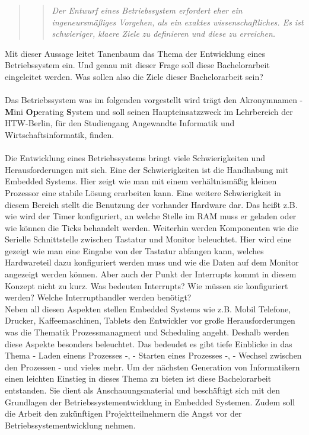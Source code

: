 \begin{quote}
\blockquote{\textit{Der Entwurf eines Betriebssystem erfordert eher ein ingeneursm\"a\ss iges Vorgehen, als ein exaktes wissenschaftliches. Es ist schwieriger, klaere Ziele zu definieren und diese zu erreichen.}}\parencite[911]{os}
\end{quote}
Mit dieser Aussage leitet Tanenbaum das Thema der Entwicklung eines Betriebssystem ein. Und genau mit dieser Frage soll diese Bachelorarbeit eingeleitet werden. Was sollen also die Ziele dieser Bachelorarbeit sein?\\\\
Das Betriebssystem was im folgenden vorgestellt wird tr\"agt den Akronymnamen \mops - \textbf{M}ini \textbf{Op}erating \textbf{S}ystem und soll seinen Haupteinsatzzweck im Lehrbereich der HTW-Berlin, f\"ur den Studiengang Angewandte Informatik und Wirtschaftsinformatik, finden.\\ \\
Die Entwicklung eines Betriebssystems bringt viele Schwierigkeiten und Herausforderungen mit sich. Eine der Schwierigkeiten ist die Handhabung mit Embedded Systems. Hier zeigt \mops wie man mit einem verh\"altnism\"a\ss ig kleinen Prozessor eine stabile L\"osung erarbeiten kann. Eine weitere Schwierigkeit in diesem Bereich stellt die Benutzung der vorhander Hardware dar. Das hei\ss t z.B. wie wird der Timer konfiguriert, an welche Stelle im RAM muss er geladen oder wie k\"onnen die Ticks behandelt werden. Weiterhin werden Komponenten wie die Serielle Schnittstelle zwischen Tastatur und Monitor beleuchtet. Hier wird eine gezeigt wie man eine Eingabe von der Tastatur abfangen kann, welches Hardwareteil dazu konfiguriert werden muss und wie die Daten auf dem Monitor angezeigt werden k\"onnen. Aber auch der Punkt der Interrupts kommt in diesem Konzept nicht zu kurz. Was bedeuten Interrupts? Wie m\"ussen sie konfiguriert werden? Welche Interrupthandler werden ben\"otigt?\\ Neben all diesen Aspekten stellen Embedded Systems wie z.B. Mobil Telefone, Drucker, Kaffeemaschinen, Tablets den Entwickler vor gro\ss e Herausforderungen was die Thematik Prozessmanagment und Scheduling angeht. Deshalb werden diese Aspekte besonders beleuchtet. Das bedeudet es gibt tiefe Einblicke in das Thema - Laden einens Prozesses -, - Starten eines Prozesses -, - Wechsel zwischen den Prozessen - und vieles mehr. Um der n\"achsten Generation von Informatikern einen leichten Einstieg in dieses Thema zu bieten ist diese Bachelorarbeit entstanden. Sie dient als Anschauungsmaterial und besch\"aftigt sich mit den Grundlagen der Betriebssystementwicklung in Embedded Systemen. Zudem soll die Arbeit den zuk\"unftigen Projektteilnehmern die Angst vor der Betriebssystementwicklung nehmen. \\
